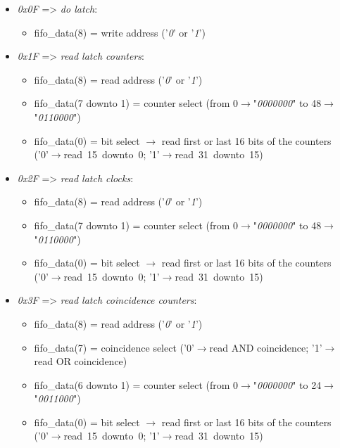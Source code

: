 \begin{itemize}
	\item \textit{0x0F} => \textit{do latch}: 
	\begin{itemize}
		\item fifo\_data(8) = write address ('\textit{0}' or '\textit{1}')
	\end{itemize}
	\item \textit{0x1F} => \textit{read latch counters}:
	\begin{itemize}
		\item fifo\_data(8) = read address ('\textit{0}' or '\textit{1}')
		\item fifo\_data(7 downto 1) = counter select (from 0$\rightarrow$"\textit{0000000}" to 48$\rightarrow$"\textit{0110000}")
		\item fifo\_data(0) = bit select $\rightarrow$ read first or last 16 bits of the counters \\('0'$\rightarrow$read~15~downto~0; '1'$\rightarrow$read~31~downto~15)
	\end{itemize}
	\item \textit{0x2F} => \textit{read latch clocks}:
	\begin{itemize}
		\item fifo\_data(8) = read address ('\textit{0}' or '\textit{1}')
		\item fifo\_data(7 downto 1) = counter select (from 0$\rightarrow$"\textit{0000000}" to 48$\rightarrow$"\textit{0110000}")
		\item fifo\_data(0) = bit select $\rightarrow$ read first or last 16 bits of the counters \\('0'$\rightarrow$read~15~downto~0; '1'$\rightarrow$read~31~downto~15)
	\end{itemize}
	\item \textit{0x3F} => \textit{read latch coincidence counters}:
	\begin{itemize}
		\item fifo\_data(8) = read address ('\textit{0}' or '\textit{1}')
		\item fifo\_data(7) = coincidence select ('0'$\rightarrow$read AND coincidence; '1'$\rightarrow$read OR coincidence)
		\item fifo\_data(6 downto 1) = counter select (from 0$\rightarrow$"\textit{0000000}" to 24$\rightarrow$"\textit{0011000}")
		\item fifo\_data(0) = bit select $\rightarrow$ read first or last 16 bits of the counters \\('0'$\rightarrow$read~15~downto~0; '1'$\rightarrow$read~31~downto~15)

\end{itemize}
\end{itemize}
